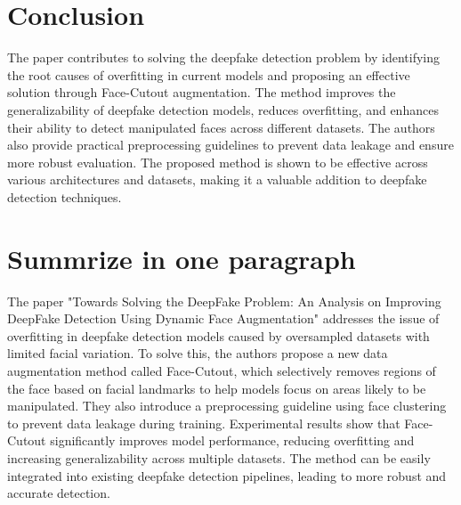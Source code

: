 \documentclass{report}
\begin{document}
	\section{Conclusion}
	The paper contributes to solving the deepfake detection problem by identifying the root causes of overfitting in current models and proposing an effective solution through Face-Cutout augmentation. The method improves the generalizability of deepfake detection models, reduces overfitting, and enhances their ability to detect manipulated faces across different datasets. The authors also provide practical preprocessing guidelines to prevent data leakage and ensure more robust evaluation. The proposed method is shown to be effective across various architectures and datasets, making it a valuable addition to deepfake detection techniques.
	
	
	\section{Summrize in one paragraph}
	The paper "Towards Solving the DeepFake Problem: An Analysis on Improving DeepFake Detection Using Dynamic Face Augmentation" addresses the issue of overfitting in deepfake detection models caused by oversampled datasets with limited facial variation. To solve this, the authors propose a new data augmentation method called Face-Cutout, which selectively removes regions of the face based on facial landmarks to help models focus on areas likely to be manipulated. They also introduce a preprocessing guideline using face clustering to prevent data leakage during training. Experimental results show that Face-Cutout significantly improves model performance, reducing overfitting and increasing generalizability across multiple datasets. The method can be easily integrated into existing deepfake detection pipelines, leading to more robust and accurate detection.
	
	
	
	
	\newpage
	
	
	
\end{document}
